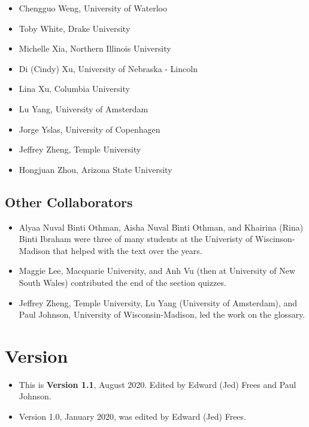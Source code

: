 \documentclass[
]{book}
\providecommand{\tightlist}{%
  \setlength{\itemsep}{0pt}\setlength{\parskip}{0pt}}
\begin{document}
\begin{itemize}
\item
  Chengguo Weng, University of Waterloo
\item
  Toby White, Drake University
\item
  Michelle Xia, Northern Illinois University
\item
  Di (Cindy) Xu, University of Nebraska - Lincoln
\item
  Lina Xu, Columbia University
\item
  Lu Yang, University of Amsterdam
\item
  Jorge Yslas, University of Copenhagen
\item
  Jeffrey Zheng, Temple University
\item
  Hongjuan Zhou, Arizona State University
\end{itemize}

\hypertarget{other-collaborators}{%
\subsection*{Other Collaborators}\label{other-collaborators}}

\begin{itemize}
\tightlist
\item
  Alyaa Nuval Binti Othman, Aisha Nuval Binti Othman, and Khairina (Rina) Binti Ibraham were three of many students at the Univeristy of Wiscinson-Madison that helped with the text over the years.
\item
  Maggie Lee, Macquarie University, and Anh Vu (then at University of New South Wales) contributed the end of the section quizzes.
\item
  Jeffrey Zheng, Temple University, Lu Yang (University of Amsterdam), and Paul Johnson, University of Wisconsin-Madison, led the work on the glossary.
\end{itemize}

\hypertarget{version}{%
\section*{Version}\label{version}}

\begin{itemize}
\tightlist
\item
  This is \textbf{Version 1.1}, August 2020. Edited by Edward (Jed) Frees and Paul Johnson.
\item
  Version 1.0, January 2020, was edited by Edward (Jed) Frees.
\end{itemize}
\end{document}
